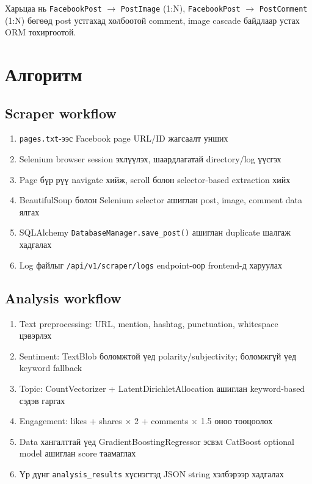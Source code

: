 \documentclass[
12pt,
oneside,
english,
onehalfspacing,
nolistspacing,
headsepline,
]{MUST-Thesis}
\begin{document}
Харьцаа нь \texttt{FacebookPost} $\rightarrow$ \texttt{PostImage} (1:N), \texttt{FacebookPost} $\rightarrow$ \texttt{PostComment} (1:N) бөгөөд post устгахад холбоотой comment, image cascade байдлаар устах ORM тохиргоотой.

\section{Алгоритм}

\subsection{Scraper workflow}
\begin{enumerate}
    \item \texttt{pages.txt}-ээс Facebook page URL/ID жагсаалт унших
    \item Selenium browser session эхлүүлэх, шаардлагатай directory/log үүсгэх
    \item Page бүр рүү navigate хийж, scroll болон selector-based extraction хийх
    \item BeautifulSoup болон Selenium selector ашиглан post, image, comment data ялгах
    \item SQLAlchemy \texttt{DatabaseManager.save\_post()} ашиглан duplicate шалгаж хадгалах
    \item Log файлыг \texttt{/api/v1/scraper/logs} endpoint-оор frontend-д харуулах
\end{enumerate}

\subsection{Analysis workflow}
\begin{enumerate}
    \item Text preprocessing: URL, mention, hashtag, punctuation, whitespace цэвэрлэх
    \item Sentiment: TextBlob боломжтой үед polarity/subjectivity; боломжгүй үед keyword fallback
    \item Topic: CountVectorizer + LatentDirichletAllocation ашиглан keyword-based сэдэв гаргах
    \item Engagement: likes + shares $\times$ 2 + comments $\times$ 1.5 оноо тооцоолох
    \item Data хангалттай үед GradientBoostingRegressor эсвэл CatBoost optional model ашиглан score таамаглах
    \item Үр дүнг \texttt{analysis\_results} хүснэгтэд JSON string хэлбэрээр хадгалах
\end{enumerate}
\end{document}
